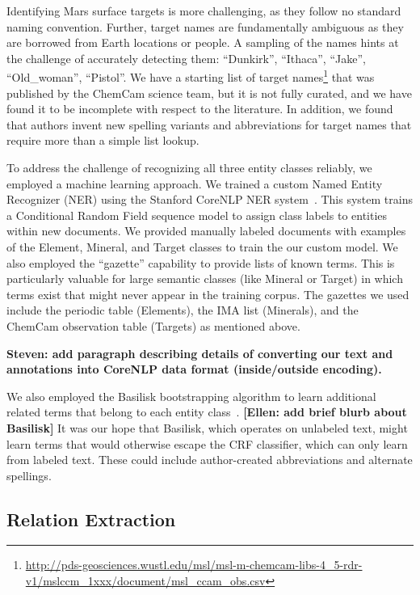 \documentclass[letterpaper]{article} %
\begin{document}
Identifying Mars surface targets is more challenging, as they follow
no standard naming convention.  Further, target names are
fundamentally ambiguous as they are borrowed from Earth locations or
people.  A sampling of the names hints at the challenge of accurately
detecting them: ``Dunkirk'', ``Ithaca'', ``Jake'', ``Old\_woman'',
``Pistol''.  We have a starting list of target
names\footnote{\url{http://pds-geosciences.wustl.edu/msl/msl-m-chemcam-libs-4_5-rdr-v1/mslccm_1xxx/document/msl_ccam_obs.csv}}
that was published by the ChemCam science team, but it is not fully
curated, and we have found it to be incomplete with respect to the
literature.
%
In addition, we found that authors invent new spelling
variants and abbreviations for target names that require more than a
simple list lookup.

To address the challenge of recognizing all three entity classes
reliably, we employed a machine learning approach.  We trained a
custom Named Entity Recognizer (NER) using the Stanford CoreNLP NER
system~\cite{finkel:ner05}.  This system trains a Conditional Random
Field sequence model to assign class labels to entities within new
documents.  We provided manually labeled documents with examples of
the Element, Mineral, and Target classes to train the our custom
model.  We also employed the ``gazette'' capability to provide lists
of known terms.  This is particularly valuable for large semantic
classes (like Mineral or Target) in which terms exist that might never
appear in the training corpus.  The gazettes we used include the
periodic table (Elements), the IMA list (Minerals), and the ChemCam
observation table (Targets) as mentioned above.

{\bf Steven: add paragraph describing details of converting our text and
annotations into CoreNLP data format (inside/outside encoding).}


We also employed the Basilisk bootstrapping algorithm to learn
additional related terms that belong to each entity
class~\cite{thelen:basilisk02}.  {\bf [Ellen: add brief blurb about
Basilisk]}  It was our hope that Basilisk, which operates on unlabeled
text, might learn terms that would otherwise escape the CRF
classifier, which can only learn from labeled text.  These could
include author-created abbreviations and alternate spellings.

\subsection{Relation Extraction}
\end{document}

